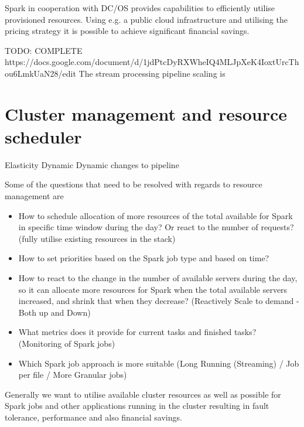 \documentclass[a4paper, 10 pt, conference]{IEEEtran}
\begin{document}
Spark in cooperation with DC/OS provides capabilities to efficiently utilise provisioned resources. Using e.g. a public cloud infrastructure and utilising the pricing strategy it is possible to achieve significant financial savings.
 
 
TODO: COMPLETE https://docs.google.com/document/d/1jdPtcDyRXWheIQ4MLJpXeK4IoxtUrcThou6LmkUaN28/edit
The stream processing pipeline scaling is 

\section{Cluster management and resource scheduler}
Elasticity
Dynamic
Dynamic changes to pipeline

Some of the questions that need to be resolved with regards to resource management are

\begin{itemize}
  \item How to schedule allocation of more resources of the total available for Spark in specific time window during the day? Or react to the number of requests? (fully utilise existing resources in the stack)
  
  \item How to set priorities based on the Spark job type and based on time?
  
  \item How to react to the change in the number of available servers during the day, so it can allocate more resources for Spark when the total available servers increased, and shrink that when they decrease? (Reactively Scale to demand - Both up and Down) 
  
  \item What metrics does it provide for current tasks and finished tasks? (Monitoring of Spark jobs)

  \item Which Spark job approach is more suitable  (Long Running (Streaming) / Job per file / More Granular jobs) 
    
\end{itemize}

Generally we want to utilise available cluster resources as well as possible for Spark jobs and other applications running in the cluster resulting in fault tolerance, performance and also financial savings. 
\end{document}
